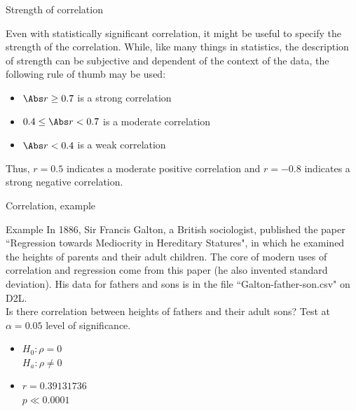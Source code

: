 \documentclass[xcolor=table, aspectratio=169, bigger]{beamer}
\begin{document}
\begin{frame}{Strength of correlation}
\begin{block}{}
Even with statistically significant correlation, it might be useful to specify the strength of the correlation. While, like many things in statistics, the description of strength can be subjective and dependent of the context of the data, the following rule of thumb may be used:
\begin{itemize}
\pause\item $\Abs r \ge 0.7$ is a strong correlation
\pause\item $0.4 \le \Abs r < 0.7$ is a moderate correlation
\pause\item $\Abs r < 0.4$ is a weak correlation
\end{itemize}
\pause Thus, $r=0.5$ indicates a moderate positive correlation and $r=-0.8$ indicates a strong negative correlation.
\end{block}
\end{frame}


\begin{frame}{Correlation, example}
\begin{exampleblock}{Example}
In 1886, Sir Francis Galton, a British sociologist, published the paper ``Regression towards Mediocrity in Hereditary Statures", in which he examined the heights of parents and their adult children. The core of modern uses of correlation and regression come from this paper (he also invented standard deviation). His data for fathers and sons is in the file ``Galton-father-son.csv" on D2L.\\
\medskip
Is there correlation between heights of fathers and their adult sons? Test at $\alpha = 0.05$ level of significance.
\begin{itemize}
\pause\item $H_0: \rho = 0$\\$H_a: \rho \ne 0$ 
\pause\item $r = 0.39131736$ \\ $p \ll 0.0001$
\end{itemize} 
\end{exampleblock}
\end{frame}
\end{document}
